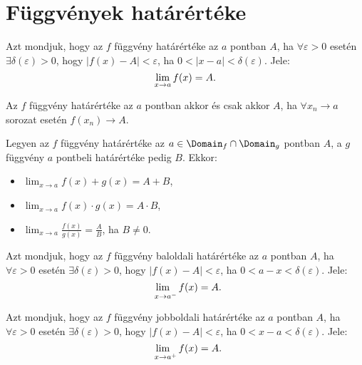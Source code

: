 \section{Függvények határértéke}

\begin{definition}
  Azt mondjuk, hogy az $f$ függvény határértéke az $a$ pontban $A$, ha $\forall
    \varepsilon > 0$ esetén $\exists \delta(\varepsilon) > 0$, hogy $|f(x) - A|
    < \varepsilon$, ha $0 < |x - a| < \delta(\varepsilon)$. Jele:
  \[
    \lim_{x \rightarrow a} f(x) = A
    \text.
  \]
\end{definition}

\begin{theorem}
  Az $f$ függvény határértéke az $a$ pontban akkor és csak akkor $A$, ha
  $\forall x_n \rightarrow a$ sorozat esetén $f(x_n) \rightarrow A$.
\end{theorem}

\begin{theorem}
  Legyen az $f$ függvény határértéke az $a \in \Domain_f \cap \Domain_g$ pontban
  $A$, a $g$ függvény $a$ pontbeli határértéke pedig $B$. Ekkor:
  \begin{itemize}
    \item $\displaystyle \lim_{x \rightarrow a} f(x) + g(x) = A + B$,
    \item $\displaystyle \lim_{x \rightarrow a} f(x) \cdot g(x) = A \cdot B$,
    \item $\displaystyle \lim_{x \rightarrow a} \frac{f(x)}{g(x)} = \frac{A}{B}$,
          ha  $B \neq 0$.
  \end{itemize}
\end{theorem}

\begin{definition}
  Azt mondjuk, hogy az $f$ függvény baloldali határértéke az $a$ pontban $A$, ha
  $\forall \varepsilon > 0$ esetén $\exists \delta(\varepsilon) > 0$, hogy
  $|f(x) - A| < \varepsilon$, ha $0 < a - x < \delta(\varepsilon)$. Jele:
  \[
    \lim_{\phantom{{}^-}x \rightarrow a^-} f(x) = A
    \text.
  \]
\end{definition}

\begin{definition}
  Azt mondjuk, hogy az $f$ függvény jobboldali határértéke az $a$ pontban $A$,
  ha $\forall \varepsilon > 0$ esetén $\exists \delta(\varepsilon) > 0$, hogy
  $|f(x) - A| < \varepsilon$, ha $0 < x - a < \delta(\varepsilon)$.
  Jele:
  \[
    \lim_{\phantom{{}^+}x \rightarrow a^+} f(x) = A
    \text.
  \]
\end{definition}

